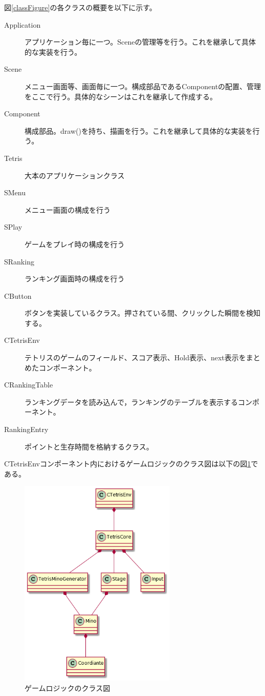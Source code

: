 \documentclass[a4paper,11pt]{jsarticle}
\begin{document}
図\ref{classFigure}の各クラスの概要を以下に示す。
\begin{description}
  \item[Application] アプリケーション毎に一つ。Sceneの管理等を行う。これを継承して具体的な実装を行う。
  \item[Scene] メニュー画面等、画面毎に一つ。構成部品であるComponentの配置、管理をここで行う。具体的なシーンはこれを継承して作成する。
  \item[Component] 構成部品。draw()を持ち、描画を行う。これを継承して具体的な実装を行う。  
  \item[Tetris] 大本のアプリケーションクラス
  \item[SMenu] メニュー画面の構成を行う
  \item[SPlay] ゲームをプレイ時の構成を行う
  \item[SRanking] ランキング画面時の構成を行う
  \item[CButton] ボタンを実装しているクラス。押されている間、クリックした瞬間を検知する。  
  \item[CTetrisEnv] テトリスのゲームのフィールド、スコア表示、Hold表示、next表示をまとめたコンポーネント。
  \item[CRankingTable] ランキングデータを読み込んで，ランキングのテーブルを表示するコンポーネント。
  \item[RankingEntry] ポイントと生存時間を格納するクラス。
  
\end{description}
\clearpage
CTetrisEnvコンポーネント内におけるゲームロジックのクラス図は以下の図\ref{logic}である。
\begin{figure}[H]
\begin{center}
\includegraphics[width=75mm]{logic.png}
\caption{ゲームロジックのクラス図}
\label{logic}
\end{center}
\end{figure}
\end{document}
